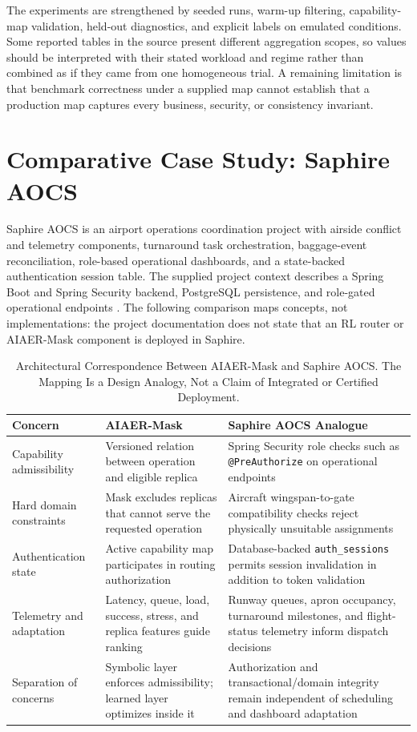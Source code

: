\documentclass[conference]{IEEEtran}
\begin{document}
The experiments are strengthened by seeded runs, warm-up filtering, capability-map validation, held-out diagnostics, and explicit labels on emulated conditions. Some reported tables in the source present different aggregation scopes, so values should be interpreted with their stated workload and regime rather than combined as if they came from one homogeneous trial. A remaining limitation is that benchmark correctness under a supplied map cannot establish that a production map captures every business, security, or consistency invariant.

\section{Comparative Case Study: Saphire AOCS}
Saphire AOCS is an airport operations coordination project with airside conflict and telemetry components, turnaround task orchestration, baggage-event reconciliation, role-based operational dashboards, and a state-backed authentication session table. The supplied project context describes a Spring Boot and Spring Security backend, PostgreSQL persistence, and role-gated operational endpoints \cite{SaphireAOCS}. The following comparison maps concepts, not implementations: the project documentation does not state that an RL router or AIAER-Mask component is deployed in Saphire.

\begin{table}[t]
\caption{Architectural Correspondence Between AIAER-Mask and Saphire AOCS. The Mapping Is a Design Analogy, Not a Claim of Integrated or Certified Deployment.}
\label{tab:saphire}
\centering
\small
\renewcommand{\arraystretch}{1.15}
\begin{tabular}{>{\raggedright\arraybackslash}p{}>{\raggedright\arraybackslash}p{}>{\raggedright\arraybackslash}p{}}
\toprule
\textbf{Concern} & \textbf{AIAER-Mask} & \textbf{Saphire AOCS Analogue}\\
\midrule
Capability admissibility & Versioned relation between operation and eligible replica & Spring Security role checks such as \texttt{@PreAuthorize} on operational endpoints\\
Hard domain constraints & Mask excludes replicas that cannot serve the requested operation & Aircraft wingspan-to-gate compatibility checks reject physically unsuitable assignments\\
Authentication state & Active capability map participates in routing authorization & Database-backed \texttt{auth\_sessions} permits session invalidation in addition to token validation\\
Telemetry and adaptation & Latency, queue, load, success, stress, and replica features guide ranking & Runway queues, apron occupancy, turnaround milestones, and flight-status telemetry inform dispatch decisions\\
Separation of concerns & Symbolic layer enforces admissibility; learned layer optimizes inside it & Authorization and transactional/domain integrity remain independent of scheduling and dashboard adaptation\\
\bottomrule
\end{tabular}
\end{table}
\end{document}
